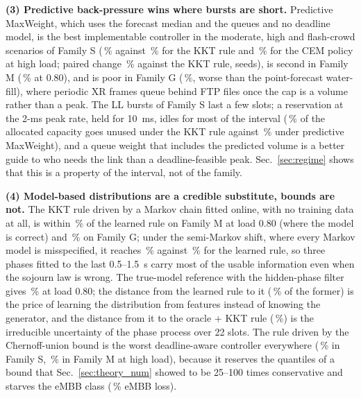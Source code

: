 \documentclass[journal]{IEEEtran}
\begin{document}
\textbf{(3) Predictive back-pressure wins where bursts are short.} Predictive MaxWeight, which uses the forecast median and the queues and no deadline model, is the best implementable controller in the moderate, high and flash-crowd scenarios of Family S (\xmeanhighpredmaxweight{}\,\% against \xmeanhighproposed{}\,\% for the KKT rule and \xmeanhighcempolicy{}\,\% for the CEM policy at high load; paired change \xredhighpredmaxweight{}\,\% against the KKT rule, \xredhighpredmaxweightWins{} seeds), is second in Family M (\xmeanmmhighpredmaxweight{}\,\% at 0.80), and is poor in Family G (\xmeantgpphighpredmaxweight{}\,\%, worse than the point-forecast water-fill), where periodic XR frames queue behind FTP files once the cap is a volume rather than a peak. The LL bursts of Family S last a few slots; a reservation at the 2-ms peak rate, held for 10~ms, idles for most of the interval (\xmeanhighproposedUnused{}\,\% of the allocated capacity goes unused under the KKT rule against \xmeanhighpredmaxweightUnused{}\,\% under predictive MaxWeight), and a queue weight that includes the predicted volume is a better guide to who needs the link than a deadline-feasible peak. Sec.~\ref{sec:regime} shows that this is a property of the interval, not of the family.

\textbf{(4) Model-based distributions are a credible substitute, bounds are not.} The KKT rule driven by a Markov chain fitted online, with no training data at all, is within \xredmmhighmarkovkkt{}\,\% of the learned rule on Family M at load 0.80 (where the model is correct) and \xredtgpphighmarkovkkt{}\,\% on Family G; under the semi-Markov shift, where every Markov model is misspecified, it reaches \xmeanmmshiftmarkovkkt{}\,\% against \xmeanmmshiftproposed{}\,\% for the learned rule, so three phases fitted to the last 0.5--1.5~s carry most of the usable information even when the sojourn law is wrong. The true-model reference with the hidden-phase filter gives \xmeanmmhighmarkovoraclekkt{}\,\% at load 0.80; the distance from the learned rule to it (\xgapMarkovOraclemmhigh{}\,\% of the former) is the price of learning the distribution from features instead of knowing the generator, and the distance from it to the oracle + KKT rule (\xmeanmmhighoraclekkt{}\,\%) is the irreducible uncertainty of the phase process over 22 slots. The rule driven by the Chernoff-union bound is the worst deadline-aware controller everywhere (\xmeanhighebkkt{}\,\% in Family S, \xmeanmmhighebkkt{}\,\% in Family M at high load), because it reserves the quantiles of a bound that Sec.~\ref{sec:theory_num} showed to be 25--100 times conservative and starves the eMBB class (\xmeanmmhighebkktEMBB{}\,\% eMBB loss).
\end{document}
